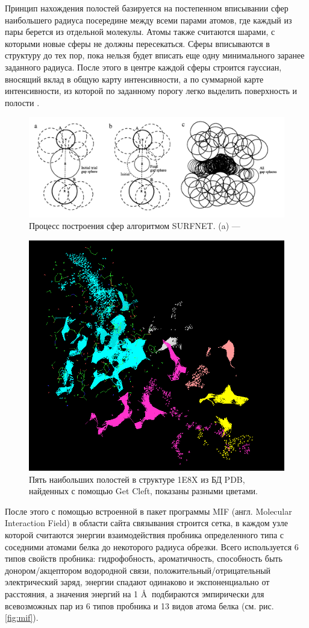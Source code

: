 \documentclass[a4paper,14pt]{article}         %
\newcommand{\sic}[1]{\LARGE\color{orange}{#1}\color{black}\Large}
\begin{document}
Принцип нахождения полостей базируется на постепенном вписывании сфер наибольшего радиуса посередине между всеми парами атомов, где каждый из пары берется из отдельной молекулы. Атомы также считаются шарами, с которыми новые сферы не должны пересекаться. Сферы вписываются в структуру до тех пор, пока нельзя будет вписать еще одну минимального заранее заданного радиуса. После этого в центре каждой сферы строится гауссиан, вносящий вклад в общую карту интенсивности, а по суммарной карте интенсивности, из которой по заданному порогу легко выделить поверхность и полости \cite{Laskowski1995}.
\begin{figure} 
	\centering
	\includegraphics[width=1\linewidth]{pictures/surfnet}
	\caption{Процесс построения сфер алгоритмом SURFNET. (a) ---  \sic{Дописать}}
	\label{fig:surfnet}
\end{figure}
\fi
\begin{figure} 
		\centering
		\includegraphics[width=0.6\linewidth]{pictures/clefts}
		\caption{Пять наибольших полостей в структуре 1E8X из БД PDB, найденных с помощью Get Cleft, показаны разными цветами.}
		\label{fig:cleft}
\end{figure}

После этого с помощью встроенной в пакет программы MIF (англ. Molecular Interaction Field) в области сайта связывания строится сетка, в каждом узле которой считаются энергии взаимодействия пробника определенного типа с соседними атомами белка до некоторого радиуса обрезки. Всего используется 6 типов свойств пробника: гидрофобность, ароматичность, способность быть донором/акцептором водородной связи, положительный/отрицательный электрический заряд, энергии спадают одинаково и экспоненциально от расстояния, а значения энергий на 1 \AA $\:$ подбираются эмпирически для всевозможных пар из 6 типов пробника и 13 видов атома белка (см. рис. \ref{fig:mif}).
\end{document}
